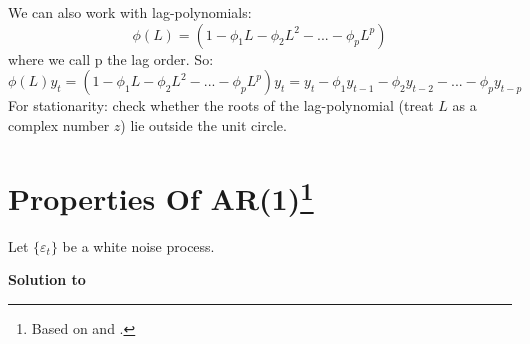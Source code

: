 \documentclass[a4paper]{scrartcl}
\begin{document}
\begin{enumerate}
\begin{solution}
                  We can also work with lag-polynomials:$$ \phi(L) = (1-\phi_1 L-\phi_2 L^2 -... - \phi_p L^p)$$ where we call p the lag order. So:
                  $$ \phi(L) y_t = (1-\phi_1 L-\phi_2 L^2 -... - \phi_p L^p)y_t = y_t - \phi_1 y_{t-1} -\phi_2 y_{t-2} - ... - \phi_p y_{t-p}$$
                  For stationarity: check whether the roots of the lag-polynomial (treat $L$ as a complex number $z$) lie outside the unit circle.
                  \newpage
              \end{solution}
    \end{enumerate}
    \newpage
    
    \section[Properties of AR(1)]{Properties Of AR(1)\footnote{Based on \citet[Ch.~2]{BjornlandThorsrud.2015} and \citet{Luetkepohl.2004}.}}\label{ex:PropertiesAR1}
    Let $\{\varepsilon_t\}$ be a white noise process.
    \begin{solution}\textbf{Solution to }
    \end{solution}
\end{document}
